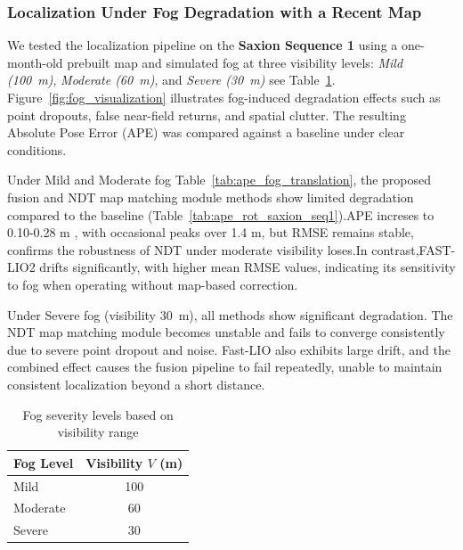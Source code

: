 \subsubsection{Localization Under Fog Degradation with a Recent Map}

We tested the localization pipeline on the \textbf{Saxion Sequence 1} using a one-month-old prebuilt map and simulated fog at three visibility levels: \textit{Mild (100~m)}, \textit{Moderate (60~m)}, and \textit{Severe (30~m)} see Table~\ref{tab:noise_levels}. Figure~\ref{fig:fog_visualization} illustrates fog-induced degradation effects such as point dropouts, false near-field returns, and spatial clutter. The resulting {Absolute Pose Error (APE)} was compared against a baseline under clear conditions.


Under Mild and Moderate fog Table~\ref{tab:ape_fog_translation}, the proposed fusion and NDT map matching module methods show limited degradation compared to the baseline (Table~\ref{tab:ape_rot_saxion_seq1}).APE increses to 0.10-0.28 m , with occasional peaks over 1.4 m, but RMSE remains stable, confirms the robustness of NDT under moderate visibility loses.In contrast,FAST-LIO2 drifts significantly, with higher mean RMSE values, indicating its sensitivity to fog when operating without map-based correction.

Under Severe fog (visibility 30~m), all methods show significant degradation. The {NDT map matching module becomes unstable} and fails to converge consistently due to severe point dropout and noise. {Fast-LIO also exhibits large drift}, and the combined effect causes the {fusion pipeline to fail repeatedly}, unable to maintain consistent localization beyond a short distance.

\begin{table}[H]
	\centering
	\caption{Fog severity levels based on visibility range}
	\label{tab:noise_levels}
	\begin{tabular}{lc}
		\toprule
		\textbf{Fog Level} & \textbf{Visibility \( V \) (m)} \\
		\midrule
		Mild      & 100 \\
		Moderate  & 60  \\
		Severe    & 30  \\
		\bottomrule
	\end{tabular}
\end{table}
 
